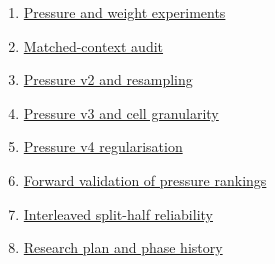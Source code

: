 \begin{enumerate}
\item \href{https://dashboard-seven-delta-35.vercel.app/library.html\#experiment}{Pressure and weight experiments}

\item \href{https://dashboard-seven-delta-35.vercel.app/library.html\#matched}{Matched-context audit}

\item \href{https://dashboard-seven-delta-35.vercel.app/library.html\#v2}{Pressure v2 and resampling}

\item \href{https://dashboard-seven-delta-35.vercel.app/library.html\#v3}{Pressure v3 and cell granularity}

\item \href{https://dashboard-seven-delta-35.vercel.app/library.html\#v4}{Pressure v4 regularisation}

\item \href{https://dashboard-seven-delta-35.vercel.app/library.html\#forward}{Forward validation of pressure rankings}

\item \href{https://dashboard-seven-delta-35.vercel.app/library.html\#split}{Interleaved split-half reliability}

\item \href{https://dashboard-seven-delta-35.vercel.app/library.html\#plan}{Research plan and phase history}

\end{enumerate}
